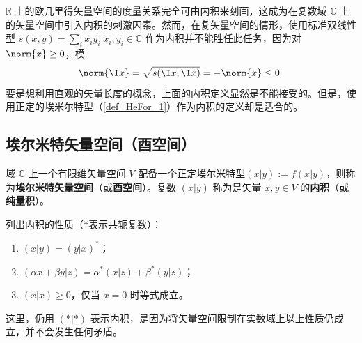 
\begin{issues}
\issueTODO
\end{issues}

$\mathbb{R}$ 上的欧几里得矢量空间的度量关系完全可由内积来刻画，这成为在复数域 $\mathbb{C}$ 上的矢量空间中引入内积的刺激因素。然而，在复矢量空间的情形，使用标准双线性型 $s( x, y)=\sum_{i}x_iy_i\;x_i,y_i\in\mathbb{C}$ 作为内积并不能胜任此任务，因为对 $\norm{x}\geq0$，模
\begin{equation}
\norm{\I x}=\sqrt{s(\I x,\I x)}=-\norm{ x}\leq0~
\end{equation}
要是想利用直观的矢量长度的概念，上面的内积定义显然是不能接受的。但是，使用正定的埃米尔特型（\autoref{def_HeFor_1}）作为内积的定义却是适合的。
\subsection{埃尔米特矢量空间（酉空间）}
\begin{definition}{}\label{def_HVorUV_1}
域 $\mathbb{C}$ 上一个有限维矢量空间 $V$ 配备一个正定埃尔米特型$( x|  y):=f(  x|  y)$，则称为\textbf{埃尔米特矢量空间}（或\textbf{酉空间}）。复数 $(  x|  y)$ 称为是矢量 $  x,  y\in V$ 的\textbf{内积}（或\textbf{纯量积}）。
\end{definition}
列出内积的性质（*表示共轭复数）：
\begin{enumerate}
\item $(  x|  y)=(  y|  x)^*$；
\item $(\alpha  x+\beta  y|  z)=\alpha^*(  x|  z)+\beta^*(  y|  z)$；
\item $(  x|  x)\geq0$，仅当 $  x=  0$ 时等式成立。
\end{enumerate}

这里，仍用 $(*|*)$ 表示内积，是因为将矢量空间限制在实数域上以上性质仍成立，并不会发生任何矛盾。

